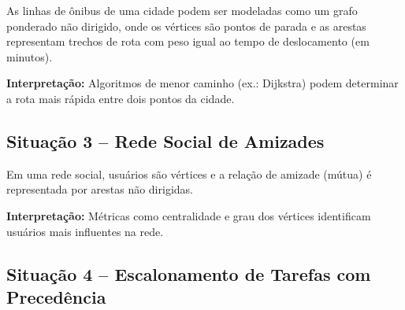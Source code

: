 \documentclass[12pt,a4paper]{article}
\begin{document}
As linhas de ônibus de uma cidade podem ser modeladas como um grafo ponderado não dirigido, onde os vértices são pontos de parada e as arestas representam trechos de rota com peso igual ao tempo de deslocamento (em minutos).

\begin{center}
\end{center}

\noindent\textbf{Interpretação:} Algoritmos de menor caminho (ex.: Dijkstra) podem determinar a rota mais rápida entre dois pontos da cidade.

\subsection{Situação 3 -- Rede Social de Amizades}

Em uma rede social, usuários são vértices e a relação de amizade (mútua) é representada por arestas não dirigidas.

\begin{center}
\end{center}

\noindent\textbf{Interpretação:} Métricas como centralidade e grau dos vértices identificam usuários mais influentes na rede.

\subsection{Situação 4 -- Escalonamento de Tarefas com Precedência}
\end{document}
